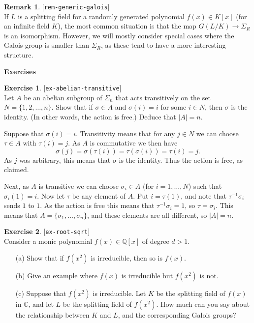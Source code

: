 \documentclass{amsart}
\newcommand{\lbl}[1]{\label{#1}\textup{[\texttt{#1}]}\ \\}
\newcommand{\lbl}{\label}
\newcommand{\Q}         {{\mathbb{Q}}}
\newcommand{\C}         {{\mathbb{C}}}
\newcommand{\sg}        {\sigma}
\newcommand{\Sg}        {\Sigma}
\renewcommand{\:}{\colon}
\newcommand{\lastexlabel}{}
\newcommand{\exlabel}[1]{
 \global\def\lastexlabel{#1}\label{#1}[\texttt{#1}]\ \\
}
\newcommand{\exlabel}[1]{
 \global\def\lastexlabel{#1}\label{#1}
}
\newenvironment{solution}{\SolutionInline}{\endSolutionInline}
\theoremstyle{definition}
\newtheorem{remark}[theorem]{Remark}
\newtheorem{exercise}{Exercise}[section]
\renewenvironment{solution}{\SolutionAtEnd}{\endSolutionAtEnd}
\begin{document}
\begin{remark}\lbl{rem-generic-galois}
 If $L$ is a splitting field for a randomly generated polynomial
 $f(x)\in K[x]$ (for an infinite field $K$), the most common situation
 is that the map $G(L/K)\to\Sg_R$ is an isomorphism.  However, we will
 mostly consider special cases where the Galois group is smaller than
 $\Sg_R$, as these tend to have a more interesting structure.
\end{remark}


\begin{center}
 \Large \textbf{Exercises}
\end{center}

\begin{exercise}\exlabel{ex-abelian-transitive}
 Let $A$ be an abelian subgroup of $\Sg_n$ that acts transitively on
 the set $N=\{1,2,\dotsc,n\}$.  Show that if $\sg\in A$ and $\sg(i)=i$
 for some $i\in N$, then $\sg$ is the identity.  (In other words, the
 action is free.)  Deduce that $|A|=n$.
\end{exercise}
\begin{solution}
 Suppose that $\sg(i)=i$.  Transitivity means that for any $j\in N$ we
 can choose $\tau\in A$ with $\tau(i)=j$.  As $A$ is commutative we
 then have
 \[ \sg(j) = \sg(\tau(i)) = \tau(\sg(i)) = \tau(i) = j. \]
 As $j$ was arbitrary, this means that $\sg$ is the identity.  
 Thus the action is free, as claimed.

 Next, as $A$ is transitive we can choose $\sg_i\in A$ (for
 $i=1,\dotsc,N$) such that $\sg_i(1)=i$.  Now let $\tau$ be any
 element of $A$.  Put $i=\tau(1)$, and note that $\tau^{-1}\sg_i$
 sends $1$ to $1$.  As the action is free this means that
 $\tau^{-1}\sg_i=1$, so $\tau=\sg_i$.  This means that
 $A=\{\sg_1,\dotsc,\sg_n\}$, and these elements are all different,
 so $|A|=n$.
\end{solution}
\begin{exercise}\exlabel{ex-root-sqrt}
 Consider a monic polynomial $f(x)\in\Q[x]$ of degree $d>1$.
 \begin{itemize}
  \item[(a)] Show that if $f(x^2)$ is irreducible, then so is $f(x)$.
  \item[(b)] Give an example where $f(x)$ is irreducible but $f(x^2)$
   is not.
  \item[(c)] Suppose that $f(x^2)$ is irreducible.  Let $K$ be the
   splitting field of $f(x)$ in $\C$, and let $L$ be the splitting
   field of $f(x^2)$.  How much can you say about the relationship
   between $K$ and $L$, and the corresponding Galois groups?
 \end{itemize}
\end{exercise}
\end{document}
